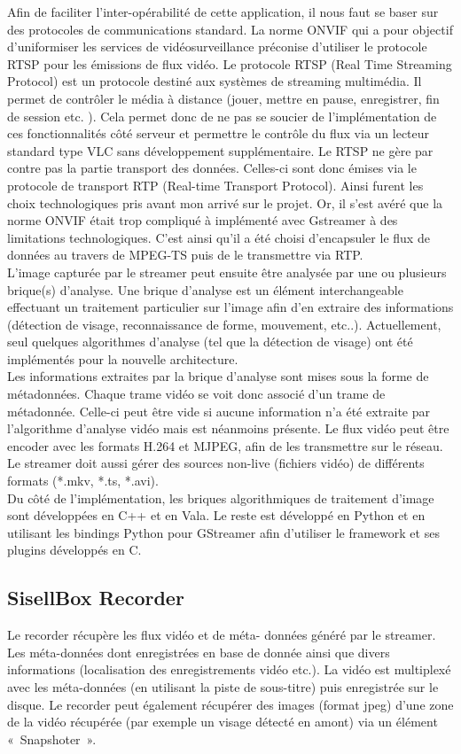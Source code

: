 Afin de faciliter l'inter-opérabilité de cette application, il nous faut se baser sur des protocoles de communications standard. La norme ONVIF qui a pour objectif d'uniformiser les services de vidéosurveillance préconise d'utiliser le protocole RTSP pour les émissions de flux vidéo. Le protocole RTSP (Real Time Streaming Protocol) est un protocole destiné aux systèmes de streaming multimédia. Il permet de contrôler le média à distance (jouer, mettre en pause, enregistrer, fin de session etc. ). Cela permet donc de ne pas se soucier de l’implémentation de ces fonctionnalités côté serveur et permettre le contrôle du flux via un lecteur standard type VLC sans développement supplémentaire. Le RTSP ne gère par contre pas la partie transport des données. Celles-ci sont donc émises via le protocole de transport RTP (Real-time Transport Protocol). Ainsi furent les choix technologiques pris avant mon arrivé sur le projet. Or, il s'est avéré que la norme ONVIF était trop compliqué à implémenté avec Gstreamer à des limitations technologiques. C'est ainsi qu'il a été choisi d'encapsuler le flux de données au travers de MPEG-TS puis de le transmettre via RTP.\\
L’image capturée par le streamer peut ensuite être analysée par une ou plusieurs brique(s) d’analyse. Une brique d'analyse est un élément interchangeable effectuant un traitement particulier sur l'image afin d'en extraire des informations (détection de visage, reconnaissance de forme, mouvement, etc..). Actuellement, seul quelques algorithmes d'analyse (tel que la détection de visage) ont été implémentés pour la nouvelle architecture.\\
Les informations extraites par la brique d'analyse sont mises sous la forme de métadonnées. Chaque trame vidéo se voit donc associé d'un trame de métadonnée. Celle-ci peut être vide si aucune information n'a été extraite par l'algorithme d'analyse vidéo mais est néanmoins présente.
Le flux vidéo peut être encoder avec les formats H.264 et MJPEG, afin de les transmettre sur le réseau. Le streamer doit aussi gérer des sources non-live (fichiers vidéo) de différents formats (*.mkv, *.ts, *.avi).\\
Du côté de l'implémentation, les briques algorithmiques de traitement d'image sont développées en C++ et en Vala. Le reste est développé en Python et en utilisant les bindings Python pour GStreamer afin d'utiliser le framework et ses plugins développés en C.


\subsection{SisellBox Recorder}
Le recorder récupère les flux vidéo et de méta- données généré par le streamer. Les méta-données dont enregistrées en base de donnée ainsi que divers informations (localisation des enregistrements vidéo etc.). La vidéo est multiplexé avec les méta-données (en utilisant la piste de sous-titre) puis enregistrée sur le disque. Le recorder peut également récupérer des images (format jpeg) d'une zone de la vidéo récupérée (par exemple un visage détecté en amont) via un élément « Snapshoter ».


